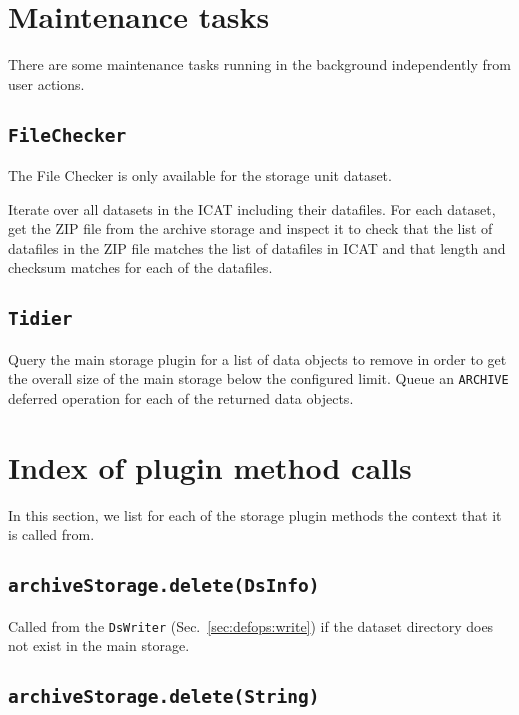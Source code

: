\documentclass[paper=a4]{scrartcl}
\begin{document}
\section{Maintenance tasks}
\label{sec:maintenance}

There are some maintenance tasks running in the background
independently from user actions.

\subsection{\texttt{FileChecker}}
\label{sec:maintenance:filechecker}

The File Checker is only available for the storage unit dataset.

Iterate over all datasets in the ICAT including their datafiles.  For
each dataset, get the ZIP file from the archive storage and inspect it
to check that the list of datafiles in the ZIP file matches the list
of datafiles in ICAT and that length and checksum matches for each of
the datafiles.

\subsection{\texttt{Tidier}}
\label{sec:maintenance:tidier}

Query the main storage plugin for a list of data objects to remove in
order to get the overall size of the main storage below the configured
limit.  Queue an \texttt{ARCHIVE} deferred operation for each of the
returned data objects.


\section{Index of plugin method calls}
\label{sec:plugincalls}

In this section, we list for each of the storage plugin methods the
context that it is called from.

\subsection{\texttt{archiveStorage.delete(DsInfo)}}

Called from the \texttt{DsWriter} (Sec.~\ref{sec:defops:write}) if
the dataset directory does not exist in the main storage.

\subsection{\texttt{archiveStorage.delete(String)}}
\end{document}
